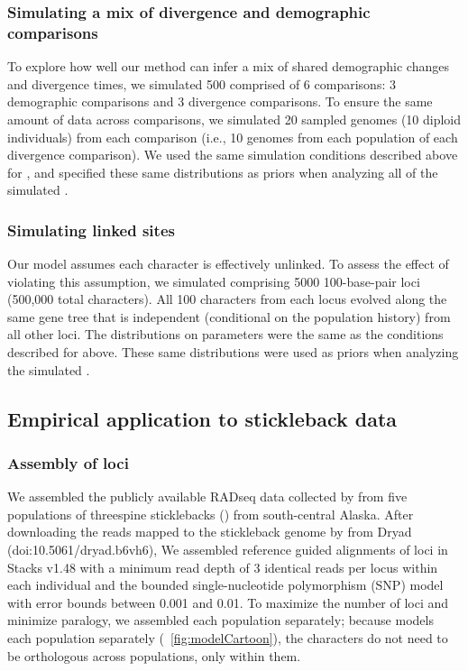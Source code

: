 \subsubsection{Simulating a mix of divergence and demographic comparisons}

To explore how well our method can infer a mix of shared demographic changes
and divergence times, we simulated 500 \datasets comprised of 6 comparisons:
3 demographic comparisons and
3 divergence comparisons.
To ensure the same amount of data across comparisons, we simulated
20 sampled genomes (10 diploid individuals) from each comparison
(i.e., 10 genomes from each population of each divergence comparison).
We used the same simulation conditions described above for
\vsimtwoinc,
and specified these same distributions as priors when analyzing all of the
simulated \datasets.


\subsubsection{Simulating linked sites}
Our model assumes each character is effectively unlinked.
To assess the effect of violating this assumption, we simulated \datasets
comprising 5000 100-base-pair loci (500,000 total characters).
All 100 characters from each locus evolved along the same gene tree that is
independent (conditional on the population history) from all other loci.
The distributions on parameters were the same
as the conditions described for \vsimfourinc above.
These same distributions were used as priors when analyzing the simulated
\datasets.



\subsection{Empirical application to stickleback data}


\subsubsection{Assembly of loci}
We assembled the publicly available RADseq data collected by
\citet{Hohenlohe2010}
from five populations of threespine sticklebacks ()
from south-central Alaska.
After downloading the reads mapped to the stickleback genome by
\citet{Hohenlohe2010}
from Dryad
(doi:10.5061/dryad.b6vh6),
We assembled reference guided alignments of loci in Stacks v1.48
\citet{Catchen2013} with a minimum read depth of 3 identical reads per locus
within each individual and the bounded single-nucleotide polymorphism (SNP)
model with error bounds between
0.001 and 0.01.
To maximize the number of loci and minimize paralogy, we assembled each
population separately;
because \ecoevolity models each population separately
(\fig{}~\ref{fig:modelCartoon}),
the characters do not need to be orthologous across populations, only within
them.

